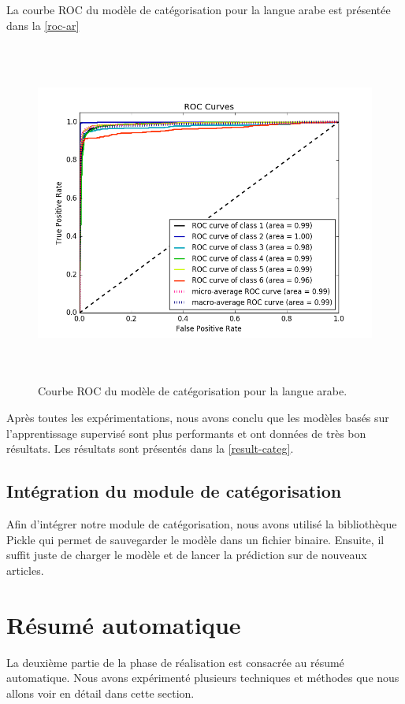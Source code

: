     La courbe ROC du modèle de catégorisation pour la langue arabe est présentée dans la \autoref{roc-ar} 
    \begin{figure}[H]
        \centering
        \includegraphics[height=320pt,width=330pt]{img/chapter4/result/rocAR.png}
        \caption{Courbe ROC du modèle de catégorisation pour la langue arabe.}
        \label{roc-ar}
    \end{figure}

    Après toutes les expérimentations, nous avons conclu que les modèles basés sur l'apprentissage supervisé sont plus performants et ont données de très bon résultats. Les résultats sont présentés dans la \autoref{result-categ}.
    
\subsection{Intégration du module de catégorisation}
Afin d'intégrer notre module de catégorisation, nous avons utilisé la bibliothèque Pickle qui permet de sauvegarder le modèle dans un fichier binaire. Ensuite, il suffit juste de charger le modèle et de lancer la prédiction sur de nouveaux articles.


\section{Résumé automatique}
La deuxième partie de la phase de réalisation est consacrée au résumé automatique. Nous avons expérimenté plusieurs techniques et méthodes que nous allons voir en détail dans cette section. 
